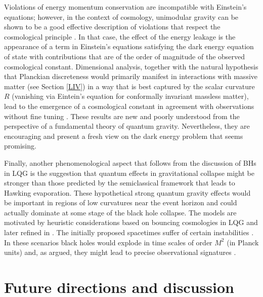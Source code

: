 \documentclass[aps, nofootinbib,superscriptaddress,12pt]{revtex4-2}
\begin{document}
Violations of energy momentum conservation are incompatible with Einstein's equations; however, in the context of cosmology, unimodular gravity can be shown to be a good effective description of violations that respect the cosmological principle \cite{Josset:2016vrq}. In that case, the effect of the energy leakage is the appearance of a term in Einstein's equations satisfying the dark energy equation of state with contributions that are of the order of magnitude of the observed cosmological constant.  Dimensional analysis, together with the natural hypothesis that Planckian discreteness would primarily manifest  in interactions with massive matter (see Section \ref{LIV}) in a way that is best captured by the scalar curvature $R$ (vanishing via Eintein's equation for conformally invariant massless matter),  lead to the emergence of a cosmological constant in agreement with observations without fine tuning \cite{nosotros}.  These results are new and poorly understood from the perspective of a fundamental theory of quantum gravity. Nevertheless, they are encouraging and present a fresh view on the dark energy problem that seems promising.  

Finally, another phenomenological aspect that follows from the discussion of BHs in LQG  is the suggestion that quantum effects in gravitational collapse might be stronger than those predicted by the semiclassical framework that leads to Hawking evaporation. These hypothetical strong quantum gravity effects would be important in regions of low curvatures near the event horizon and could actually dominate at some stage of the black hole collapse. The models are motivated by heuristic considerations based on bouncing cosmologies in LQG \cite{Rovelli:2014cta} and later refined in \cite{Haggard:2014rza, Rovelli:2014cta}. The initially proposed spacetimes suffer of certain instabilities \cite{DeLorenzo:2015gtx, Bianchi:2014bma}. In these scenarios black holes would explode in time scales of order $M^2$ (in Planck units) \cite{Christodoulou:2016vny}  and, as argued, they might lead to precise observational signatures \cite{Barrau:2014yka, Barrau:2015uca, Barrau:2014hda}.


\section{Future directions and discussion }\label{outlook}
\end{document}
